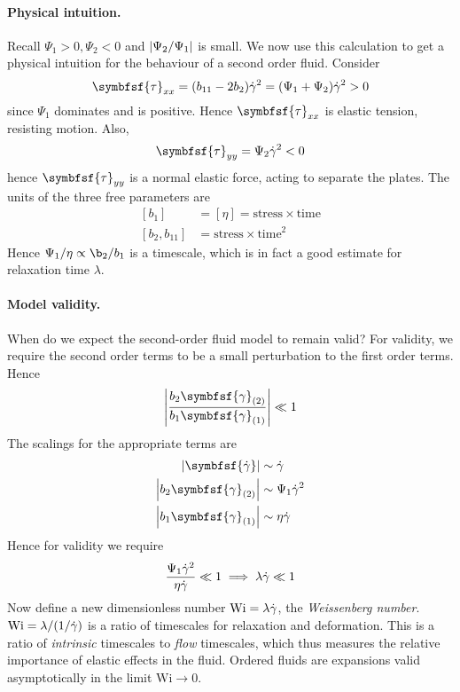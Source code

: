 \documentclass{jknotes}
\begin{document}
\paragraph{Physical intuition.}
Recall $\Psi_1 > 0, \Psi_2 < 0$ and $\abs{\Psi_2/\Psi_1}$ is small. We now use
this calculation to get a physical intuition for the behaviour of a second
order fluid. Consider
\begin{equation}
	\symbfsf{\tau}_{xx} = (b_{11} - 2b_2) \srate^2 = (\Psi_1 + \Psi_2)
	\srate^2 > 0
\end{equation}
since $\Psi_1$ dominates and is positive. Hence $\symbfsf{\tau}_{xx}$ is
elastic tension, resisting motion. Also,
\begin{equation}
	\symbfsf{\tau}_{yy} = \Psi_2 \srate^2 < 0
\end{equation}
hence $\symbfsf{\tau}_{yy}$ is a normal elastic force, acting to separate the
plates. The units of the three free parameters are
\begin{align}
	\left[ b_1\right] &= \left[ \eta \right] = \text{stress} \times \text{time}
	\\
	\left[b_2, b_{11} \right] &= \text{stress} \times \text{time}^2
\end{align}
Hence $\Psi_1 / \eta \propto \b_2/b_1$ is a timescale, which is in fact a good
estimate for relaxation time $\lambda$.

\paragraph{Model validity.}
When do we expect the second-order fluid model to remain valid? For validity,
we require the second order terms to be a small perturbation to the first
order terms. Hence
\begin{equation}
	\abs{\frac{b_2 \symbfsf{\gamma}_{(2)}}{b_1 \symbfsf{\gamma}_{(1)}}} \ll 1
\end{equation}
The scalings for the appropriate terms are
\begin{align}
	\abs{\symbfsf{\srate}} &\sim \srate\\
	\abs{b_2 \symbfsf{\gamma}_{(2)}} &\sim \Psi_1 \srate^2 \\
	\abs{b_1 \symbfsf{\gamma}_{(1)}} &\sim \eta \srate
\end{align}
Hence for validity we require
\begin{equation}
	\frac{\Psi_1 \dot{\gamma}^2}{\eta \dot{\gamma}} \ll 1 \implies \lambda \dot{\gamma} \ll 1
\end{equation}
Now define a new dimensionless number $\text{Wi} = \lambda \dot{\gamma}$, the
\emph{Weissenberg number}. $\text{Wi} = \lambda / (1/\dot{\gamma})$ is a ratio of
timescales for relaxation and deformation. This is a ratio of \emph{intrinsic}
timescales to \emph{flow} timescales, which thus measures the relative
importance of elastic effects in the fluid.  Ordered fluids are expansions
valid asymptotically in the limit $\text{Wi} \to 0$.
\end{document}
